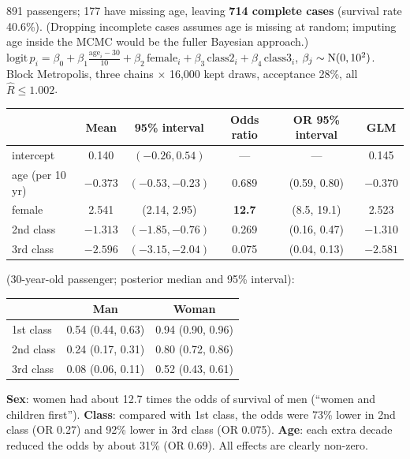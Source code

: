 \documentclass[11pt]{article}
\begin{document}
\solution
{} 891 passengers; 177 have missing age, leaving \textbf{714 complete cases} (survival rate 40.6\%). (Dropping incomplete cases assumes age is missing at random; imputing age inside the MCMC would be the fuller Bayesian approach.)
 $\mathrm{logit}\,p_i=\beta_0+\beta_1\frac{\text{age}_i-30}{10}+\beta_2\,\text{female}_i+\beta_3\,\text{class2}_i+\beta_4\,\text{class3}_i$, $\beta_j\sim\mathrm{N}(0,10^2)$. Block Metropolis, three chains $\times$ 16{,}000 kept draws, acceptance 28\%, all $\hat R\le1.002$.
\begin{center}
\small
\begin{tabular}{lcccc|c}\toprule
 & Mean & 95\% interval & Odds ratio & OR 95\% interval & GLM\\\midrule
intercept & 0.140 & $(-0.26, 0.54)$ & --- & --- & 0.145\\
age (per 10 yr) & $-0.373$ & $(-0.53,-0.23)$ & 0.689 & (0.59, 0.80) & $-0.370$\\
female & 2.541 & (2.14, 2.95) & \textbf{12.7} & (8.5, 19.1) & 2.523\\
2nd class & $-1.313$ & $(-1.85,-0.76)$ & 0.269 & (0.16, 0.47) & $-1.310$\\
3rd class & $-2.596$ & $(-3.15,-2.04)$ & 0.075 & (0.04, 0.13) & $-2.581$\\\bottomrule
\end{tabular}
\end{center}
 (30-year-old passenger; posterior median and 95\% interval):
\begin{center}
\begin{tabular}{lcc}\toprule
 & Man & Woman\\\midrule
1st class & 0.54 (0.44, 0.63) & 0.94 (0.90, 0.96)\\
2nd class & 0.24 (0.17, 0.31) & 0.80 (0.72, 0.86)\\
3rd class & 0.08 (0.06, 0.11) & 0.52 (0.43, 0.61)\\\bottomrule
\end{tabular}
\end{center}

\begin{answer}
\textbf{Sex}: women had about 12.7 times the odds of survival of men (``women and children first''). \textbf{Class}: compared with 1st class, the odds were 73\% lower in 2nd class (OR 0.27) and 92\% lower in 3rd class (OR 0.075). \textbf{Age}: each extra decade reduced the odds by about 31\% (OR 0.69). All effects are clearly non-zero.
\end{answer}
\end{document}
